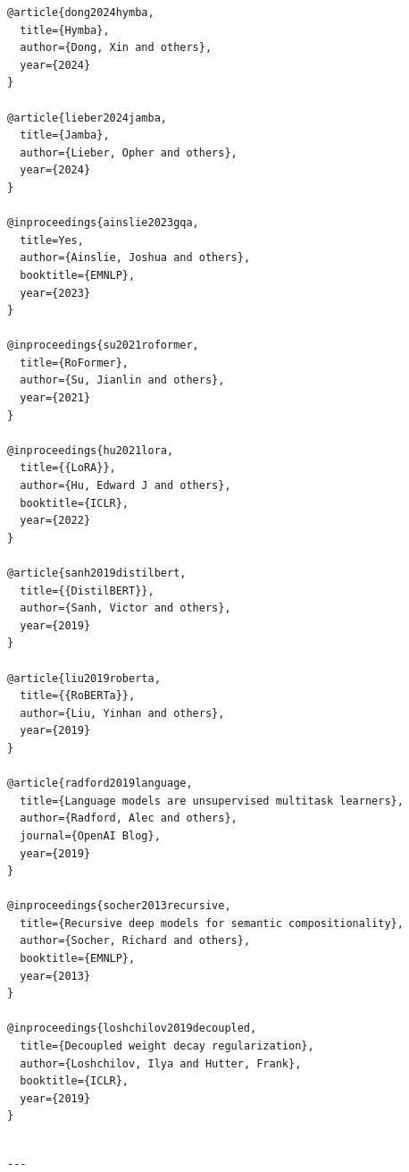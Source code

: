\begin{lstlisting}
@article{dong2024hymba,
  title={Hymba},
  author={Dong, Xin and others},
  year={2024}
}

@article{lieber2024jamba,
  title={Jamba},
  author={Lieber, Opher and others},
  year={2024}
}

@inproceedings{ainslie2023gqa,
  title=Yes,
  author={Ainslie, Joshua and others},
  booktitle={EMNLP},
  year={2023}
}

@inproceedings{su2021roformer,
  title={RoFormer},
  author={Su, Jianlin and others},
  year={2021}
}

@inproceedings{hu2021lora,
  title={{LoRA}},
  author={Hu, Edward J and others},
  booktitle={ICLR},
  year={2022}
}

@article{sanh2019distilbert,
  title={{DistilBERT}},
  author={Sanh, Victor and others},
  year={2019}
}

@article{liu2019roberta,
  title={{RoBERTa}},
  author={Liu, Yinhan and others},
  year={2019}
}

@article{radford2019language,
  title={Language models are unsupervised multitask learners},
  author={Radford, Alec and others},
  journal={OpenAI Blog},
  year={2019}
}

@inproceedings{socher2013recursive,
  title={Recursive deep models for semantic compositionality},
  author={Socher, Richard and others},
  booktitle={EMNLP},
  year={2013}
}

@inproceedings{loshchilov2019decoupled,
  title={Decoupled weight decay regularization},
  author={Loshchilov, Ilya and Hutter, Frank},
  booktitle={ICLR},
  year={2019}
}
\end{lstlisting}
\begin{lstlisting}

---
\end{lstlisting}